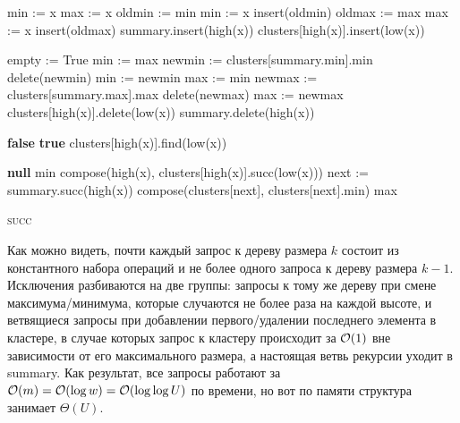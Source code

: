 \begin{algorithmic}[1]
			\State min := x
			\State max := x
			\State oldmin := min
			\State min := x
			\State insert(oldmin)
			\State oldmax := max
			\State max := x
			\State insert(oldmax)
				\State summary.insert(high(x))
			\EndIf
			\State clusters[high(x)].insert(low(x))
		\EndIf
	\EndProcedure

			\State \Return
		\EndIf
				\State empty := True
				\State min := max
			\Else
				\State newmin := clusters[summary.min].min
				\State delete(newmin)
				\State min := newmin
			\EndIf
				\State max := min
			\Else
				\State newmax := clusters[summary.max].max
				\State delete(newmax)
				\State max := newmax
			\EndIf
		\Else
			\State clusters[high(x)].delete(low(x))
				\State summary.delete(high(x))
			\EndIf
		\EndIf
	\EndProcedure

			\State \Return \textbf{false}
		\EndIf
			\State \Return \textbf{true}
		\EndIf
		\State \Return clusters[high(x)].find(low(x))
	\EndProcedure

			\State \Return \textbf{null}
		\EndIf
			\State \Return min
		\EndIf
			\State \Return compose(high(x), clusters[high(x)].succ(low(x)))
		\EndIf
			\State next := summary.succ(high(x))
			\State \Return compose(clusters[next], clusters[next].min)
		\EndIf
		\State \Return max
	\EndProcedure

		\State {} \textsc{succ}
	\EndProcedure
\end{algorithmic}

Как можно видеть, почти каждый запрос к дереву размера $k$ состоит из константного набора операций и не более одного запроса к дереву размера $k-1$. Исключения разбиваются на две группы: запросы к тому же дереву при смене максимума/минимума, которые случаются не более раза на каждой высоте, и ветвящиеся запросы при добавлении первого/удалении последнего элемента в кластере, в случае которых запрос к кластеру происходит за $\mathcal{O}(1)$ вне зависимости от его максимального размера, а настоящая ветвь рекурсии уходит в summary. Как результат, все запросы работают за $\mathcal{O}(m) = \mathcal{O}(\log w) = \mathcal{O}(\log \log U)$ по времени, но вот по памяти структура занимает $\Theta(U)$.

